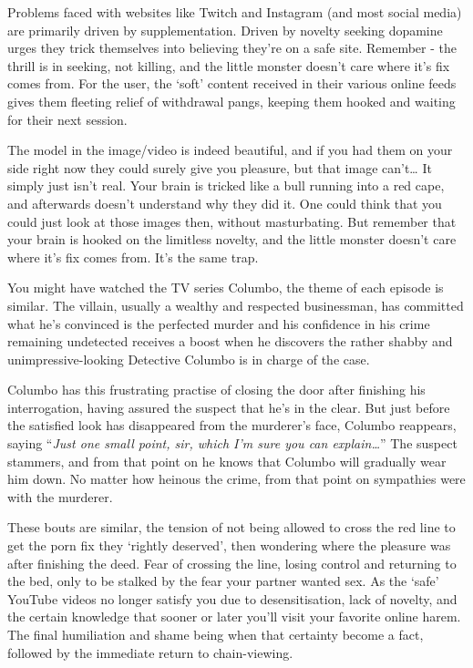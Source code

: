 \documentclass[
]{book}
\begin{document}
Problems faced with websites like Twitch and Instagram (and most social media) are primarily driven by supplementation. Driven by novelty seeking dopamine urges they trick themselves into believing they're on a safe site. Remember - the thrill is in seeking, not killing, and the little monster doesn't care where it's fix comes from. For the user, the `soft' content received in their various online feeds gives them fleeting relief of withdrawal pangs, keeping them hooked and waiting for their next session.

The model in the image/video is indeed beautiful, and if you had them on your side right now they could surely give you pleasure, but that image can't\ldots{} It simply just isn't real. Your brain is tricked like a bull running into a red cape, and afterwards doesn't understand why they did it. One could think that you could just look at those images then, without masturbating. But remember that your brain is hooked on the limitless novelty, and the little monster doesn't care where it's fix comes from. It's the same trap.

You might have watched the TV series Columbo, the theme of each episode is similar. The villain, usually a wealthy and respected businessman, has committed what he's convinced is the perfected murder and his confidence in his crime remaining undetected receives a boost when he discovers the rather shabby and unimpressive-looking Detective Columbo is in charge of the case.

Columbo has this frustrating practise of closing the door after finishing his interrogation, having assured the suspect that he's in the clear. But just before the satisfied look has disappeared from the murderer's face, Columbo reappears, saying ``\emph{Just one small point, sir, which I'm sure you can explain\ldots{}}'' The suspect stammers, and from that point on he knows that Columbo will gradually wear him down. No matter how heinous the crime, from that point on sympathies were with the murderer.

These bouts are similar, the tension of not being allowed to cross the red line to get the porn fix they `rightly deserved', then wondering where the pleasure was after finishing the deed. Fear of crossing the line, losing control and returning to the bed, only to be stalked by the fear your partner wanted sex. As the `safe' YouTube videos no longer satisfy you due to desensitisation, lack of novelty, and the certain knowledge that sooner or later you'll visit your favorite online harem. The final humiliation and shame being when that certainty become a fact, followed by the immediate return to chain-viewing.
\end{document}
